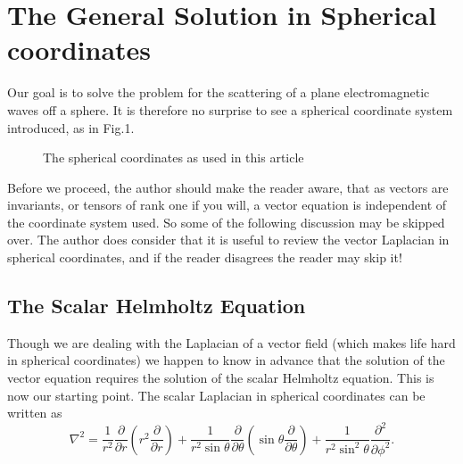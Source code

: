 \section{The General Solution in Spherical coordinates}

Our goal is to solve the problem for the scattering of a plane electromagnetic
waves off a sphere. It is therefore  no surprise to see a 
spherical coordinate system introduced, as in Fig.1.
\vspace*{10cm}
\begin{figure}[htb]
\caption{The spherical coordinates as used in this article}
\end{figure}

Before we proceed, the author should make the reader aware, that as vectors are invariants, or tensors of rank one if you will, a vector equation is independent of the coordinate system used. So some of the following discussion may be skipped over. The author does consider that it is useful to review the vector Laplacian in spherical coordinates, and if the reader disagrees the reader may skip it!

\subsection{The Scalar Helmholtz Equation}

Though we are dealing with the Laplacian of a vector field (which makes life hard
 in spherical coordinates) we happen to know in advance that the solution of the
vector equation  requires the solution of the scalar Helmholtz equation. This is
now our starting point. The scalar Laplacian in spherical coordinates can be written as
\begin{equation}
\nabla^2=\frac{1}{r^2} \frac{\partial }{\partial r} \left ( r^2 \frac{\partial}{\partial r} \right )
+\frac{1}{ r^2 \sin \theta} \frac{\partial }{\partial \theta} \left ( \sin \theta \frac{\partial}{\partial \theta } \right )
+\frac{1}{r^2 \sin^2 \theta} \frac{\partial^2}{\partial \phi^2}.
\end{equation}


